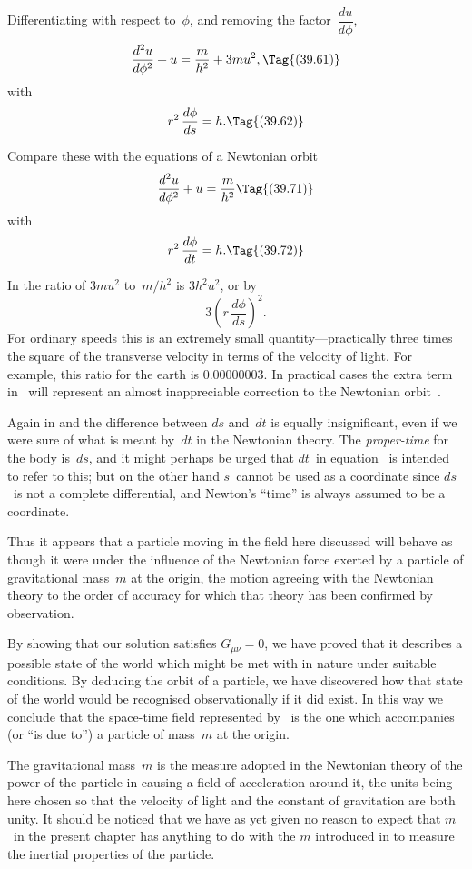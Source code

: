 \documentclass[12pt]{book}
\begin{document}
Differentiating with respect to~$\phi$, and removing the factor~$\dfrac{du}{d\phi}$,
\[
\frac{d^{2}u}{d\phi^{2}} + u = \frac{m}{h^{2}} + 3mu^2,
\Tag{(39.61)}
\]
with
\[
r^{2}\, \frac{d\phi}{ds} = h.
\Tag{(39.62)}
\]

Compare these with the equations of a Newtonian orbit
\[
\frac{d^{2}u}{d\phi^{2}} + u = \frac{m}{h^{2}}
\Tag{(39.71)}
\]
with
\[
r^{2}\, \frac{d\phi}{dt} = h.
\Tag{(39.72)}
\]

In  the ratio of $3mu^2$ to~$m/h^{2}$ is $3h^{2}u^2$, or by 
\[
3\left(r\, \frac{d\phi}{ds}\right)^{2}.
\]
For ordinary speeds this is an extremely small quantity---practically three
times the square of the transverse velocity in terms of the velocity of light.
For example, this ratio for the earth is 0.00000003. In practical cases the extra
term in~ will represent an almost inappreciable correction to the Newtonian
orbit~.

Again in  and  the difference between $ds$ and~$dt$ is equally
insignificant, even if we were sure of what is meant by~$dt$ in the Newtonian
theory. The \emph{proper\hyp{}time} for the body is~$ds$, and it might perhaps be urged
%
that $dt$~in equation~ is intended to refer to this; but on the other hand
$s$~cannot be used as a coordinate since $ds$~is not a complete differential, and
Newton's ``time'' is always assumed to be a coordinate.

Thus it appears that a particle moving in the field here discussed will
behave as though it were under the influence of the Newtonian force exerted
by a particle of gravitational mass~$m$ at the origin, the motion agreeing with
the Newtonian theory to the order of accuracy for which that theory has been
confirmed by observation.

By showing that our solution satisfies $G_{\mu\nu} = 0$, we have proved that it
describes a possible state of the world which might be met with in nature
under suitable conditions. By deducing the orbit of a particle, we have discovered
how that state of the world would be recognised observationally if it
did exist. In this way we conclude that the space-time field represented by~
is the one which accompanies (or ``is due to'') a particle of mass~$m$ at
the origin.

The gravitational mass~$m$ is the measure adopted in the Newtonian theory
of the power of the particle in causing a field of acceleration around it, the
units being here chosen so that the velocity of light and the constant of gravitation
are both unity. It should be noticed that we have as yet given no
reason to expect that $m$~in the present chapter has anything to do with the
$m$ introduced in  to measure the inertial properties of the particle.
\end{document}
